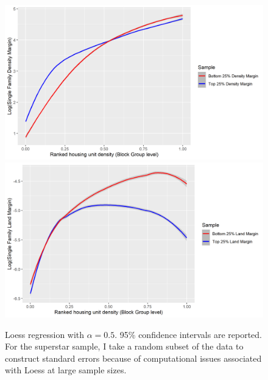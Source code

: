 \documentclass[]{article}
\begin{document}
\begin{figure}[hbpt]
	\begin{center}
		\includegraphics[width=\textwidth]{SingleFamilyDensity.png}
		\includegraphics[width=\textwidth]{SingleFamilyLand.png}
		\caption{Loess regression with $\alpha = 0.5$. 95\% confidence intervals are reported. For the superstar sample, I take a random subset of the data to construct standard errors because of computational issues associated with Loess at large sample sizes.}\label{SingleFDensityMargin}
	\end{center}
\end{figure}

\newpage
\end{document}
